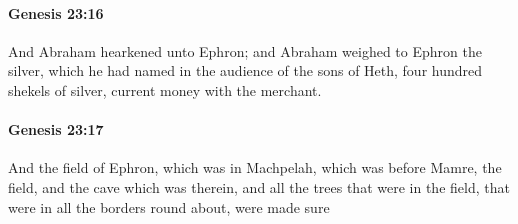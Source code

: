 		\paragraph{Genesis 23:16} %
			\label{GENESIS-23-16}

			And Abraham hearkened unto Ephron; and Abraham weighed to Ephron the silver, which he had named in the audience of the sons of Heth, four hundred shekels of silver, current money with the merchant.


		\paragraph{Genesis 23:17} %
			\label{GENESIS-23-17}

			And the field of Ephron, which was in Machpelah, which was before Mamre, the field, and the cave which was therein, and all the trees that were in the field, that were in all the borders round about, were made sure

